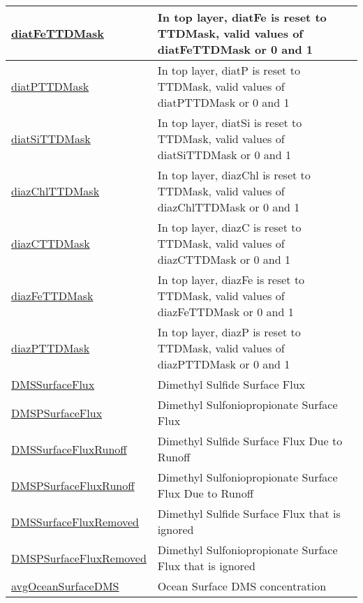 {\begin{center}
\begin{longtable}{| p{2.0in} | p{4.0in} |}
    \hline
    \hyperref[subsec:var_sec_forcing_diatFeTTDMask]{diatFeTTDMask} & In top layer, diatFe is reset to TTDMask, valid values of diatFeTTDMask or 0 and 1 \\
    \hline
    \hyperref[subsec:var_sec_forcing_diatPTTDMask]{diatPTTDMask} & In top layer, diatP is reset to TTDMask, valid values of diatPTTDMask or 0 and 1 \\
    \hline
    \hyperref[subsec:var_sec_forcing_diatSiTTDMask]{diatSiTTDMask} & In top layer, diatSi is reset to TTDMask, valid values of diatSiTTDMask or 0 and 1 \\
    \hline
    \hyperref[subsec:var_sec_forcing_diazChlTTDMask]{diazChlTTDMask} & In top layer, diazChl is reset to TTDMask, valid values of diazChlTTDMask or 0 and 1 \\
    \hline
    \hyperref[subsec:var_sec_forcing_diazCTTDMask]{diazCTTDMask} & In top layer, diazC is reset to TTDMask, valid values of diazCTTDMask or 0 and 1 \\
    \hline
    \hyperref[subsec:var_sec_forcing_diazFeTTDMask]{diazFeTTDMask} & In top layer, diazFe is reset to TTDMask, valid values of diazFeTTDMask or 0 and 1 \\
    \hline
    \hyperref[subsec:var_sec_forcing_diazPTTDMask]{diazPTTDMask} & In top layer, diazP is reset to TTDMask, valid values of diazPTTDMask or 0 and 1 \\
    \hline
    \hyperref[subsec:var_sec_forcing_DMSSurfaceFlux]{DMSSurfaceFlux} & Dimethyl Sulfide Surface Flux \\
    \hline
    \hyperref[subsec:var_sec_forcing_DMSPSurfaceFlux]{DMSPSurfaceFlux} & Dimethyl Sulfoniopropionate Surface Flux \\
    \hline
    \hyperref[subsec:var_sec_forcing_DMSSurfaceFluxRunoff]{DMSSurfaceFluxRunoff} & Dimethyl Sulfide Surface Flux Due to Runoff \\
    \hline
    \hyperref[subsec:var_sec_forcing_DMSPSurfaceFluxRunoff]{DMSPSurfaceFluxRunoff} & Dimethyl Sulfoniopropionate Surface Flux Due to Runoff \\
    \hline
    \hyperref[subsec:var_sec_forcing_DMSSurfaceFluxRemoved]{DMSSurfaceFluxRemoved} & Dimethyl Sulfide Surface Flux that is ignored \\
    \hline
    \hyperref[subsec:var_sec_forcing_DMSPSurfaceFluxRemoved]{DMSPSurfaceFluxRemoved} & Dimethyl Sulfoniopropionate Surface Flux that is ignored \\
    \hline
    \hyperref[subsec:var_sec_forcing_avgOceanSurfaceDMS]{avgOceanSurfaceDMS} & Ocean Surface DMS concentration \\

\end{longtable}
\end{center}}
